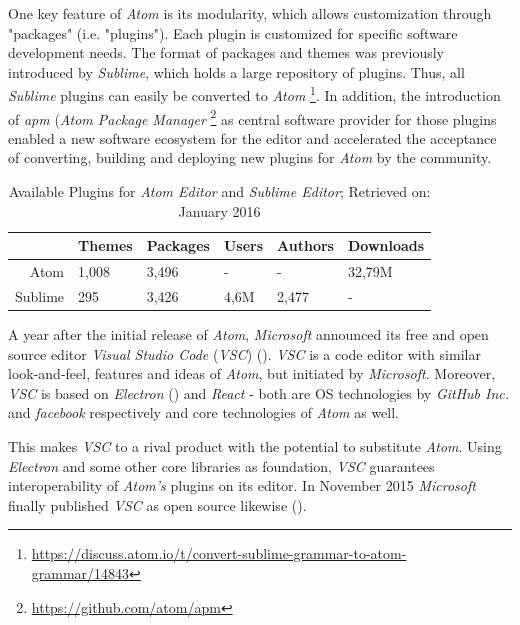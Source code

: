 One key feature of \textit{Atom} is its modularity, which allows customization through "packages" (i.e. "plugins"). Each plugin is customized for specific software development needs. The format of packages and themes was previously introduced by \textit{Sublime}, which holds a large repository of plugins. Thus, all \textit{Sublime} plugins can easily be converted to \textit{Atom}
\footnote{\url{https://discuss.atom.io/t/convert-sublime-grammar-to-atom-grammar/14843}}.
In addition, the introduction of \textit{apm} (\textit{Atom Package Manager} \footnote{\url{https://github.com/atom/apm}} as central software provider for those plugins enabled a new software ecosystem for the editor and accelerated the acceptance of converting, building and deploying new plugins for \textit{Atom} by the community.

\begin{table}[!h]
\centering
\begin{tabular}{rlllll}
  \hline
 & Themes & Packages & Users & Authors & Downloads \\
  \hline
Atom & 1,008 & 3,496 & - & - & 32,79M \\
  Sublime & 295 & 3,426 & 4,6M & 2,477 & - \\
   \hline
\end{tabular}
\caption[Available Plugins for Atom Editor and Sublime Editor]{Available Plugins for \textit{Atom Editor} and \textit{Sublime Editor}; Retrieved on:  January 2016 \protect\footnotemark}
\label{tbl:atomsublimeplugins}
\end{table}


A year after the initial release of \textit{Atom}, \textit{Microsoft} announced its free and open source editor \textit{Visual Studio Code} (\textit{VSC}) (\cite{MicrosoftLaunchesVisualStudioCode:online}). \textit{VSC} is a code editor with similar look-and-feel, features and ideas of \textit{Atom}, but initiated by \textit{Microsoft}. Moreover, \textit{VSC} is based on \textit{Electron} (\cite{electroncrossplatformapps:online}) and \textit{React} - both are OS technologies by \textit{GitHub Inc.} and \textit{facebook} respectively and core technologies of  \textit{Atom} as well.

This makes \textit{VSC} to a rival product with the potential to substitute \textit{Atom}. Using \textit{Electron} and some other core libraries as foundation, \textit{VSC} guarantees interoperability of \textit{Atom's} plugins on its editor. In November 2015 \textit{Microsoft} finally published \textit{VSC} as open source likewise  (\cite{VSCodeIsOpenSource:online}).

